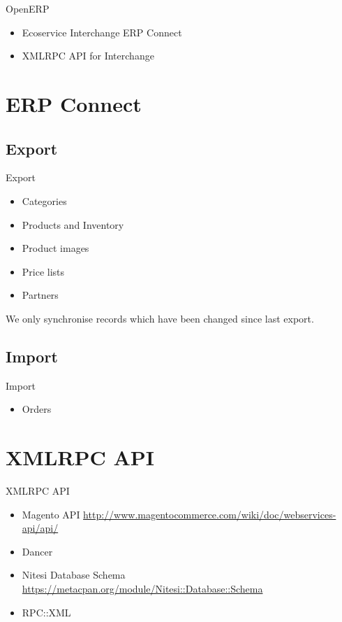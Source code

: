 \begin{frame}{OpenERP}
\begin{itemize}
\item Ecoservice Interchange ERP Connect
\item XMLRPC API for Interchange
\end{itemize}
\end{frame}

\section{ERP Connect}
\subsection{Export}
\begin{frame}{Export}
\begin{itemize}
\item Categories
\item Products and Inventory
\item Product images
\item Price lists
\item Partners
\end{itemize}
\end{frame}

We only synchronise records which have been
changed since last export.

\subsection{Import}
\begin{frame}{Import}
\begin{itemize}
\item Orders
\end{itemize}
\end{frame}

\section{XMLRPC API}
\begin{frame}{XMLRPC API}
\begin{itemize}
\item Magento API
\url{http://www.magentocommerce.com/wiki/doc/webservices-api/api/}
\item Dancer
\item Nitesi Database Schema
\url{https://metacpan.org/module/Nitesi::Database::Schema}
\item RPC::XML
\end{itemize}
\end{frame}

